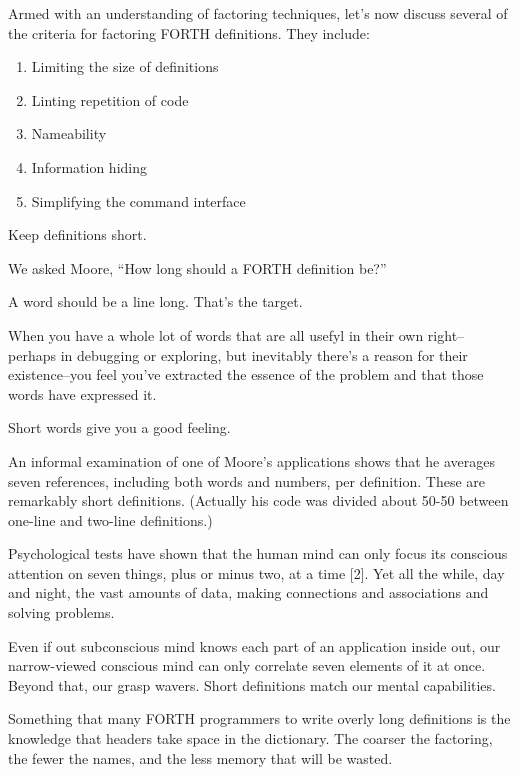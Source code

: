 Armed with an understanding of factoring techniques, let's now discuss several of the criteria for factoring FORTH definitions. They include:

\begin{enumerate}
\item Limiting the size of definitions
\item Linting repetition of code
\item Nameability
\item Information hiding
\item Simplifying the command interface
\end{enumerate}

\begin{tip}
Keep definitions short.
\end{tip}

\bigskip
\blackline{2ex}
\noindent We asked Moore, ``How long should a FORTH definition be?''

\begin{tfquot}
A word should be a line long. That's the target.

When you have a whole lot of words that are all usefyl in their own right--perhaps in debugging or exploring, but inevitably there's a reason for their existence--you feel you've extracted the essence of the problem and that those words have expressed it.

Short words give you a good feeling.
\end{tfquot}
\blackline{1ex}

An informal examination of one of Moore's applications shows that he averages seven references, including both words and numbers, per definition. These are remarkably short definitions. (Actually his code was divided about 50-50 between one-line and two-line definitions.)

Psychological tests have shown that the human mind can only focus its conscious attention on seven things, plus or minus two, at a time [2]. Yet all the while, day and night, the vast amounts of data, making connections and associations and solving problems.

Even if out subconscious mind knows each part of an application inside out, our narrow-viewed conscious mind can only correlate seven elements of it at once. Beyond that, our grasp wavers. Short definitions match our mental capabilities.

Something that many FORTH programmers to write overly long definitions is the knowledge that headers take space in the dictionary. The coarser the factoring, the fewer the names, and the less memory that will be wasted.

